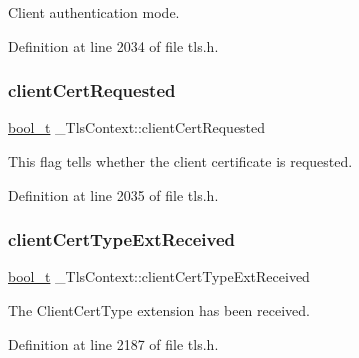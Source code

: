 Client authentication mode. 



Definition at line 2034 of file tls.\+h.

\mbox{\label{struct__TlsContext_a62a4d809ef9653728ad46a295a107bf6}} 
\subsubsection{\texorpdfstring{client\+Cert\+Requested}{clientCertRequested}}
{\footnotesize\ttfamily \hyperlink{compiler__port_8h_a812d16e5494522586b3784e55d479912}{bool\+\_\+t} \+\_\+\+Tls\+Context\+::client\+Cert\+Requested}



This flag tells whether the client certificate is requested. 



Definition at line 2035 of file tls.\+h.

\mbox{\label{struct__TlsContext_a8afe0bc107677db7d4314287841979e4}} 
\subsubsection{\texorpdfstring{client\+Cert\+Type\+Ext\+Received}{clientCertTypeExtReceived}}
{\footnotesize\ttfamily \hyperlink{compiler__port_8h_a812d16e5494522586b3784e55d479912}{bool\+\_\+t} \+\_\+\+Tls\+Context\+::client\+Cert\+Type\+Ext\+Received}



The Client\+Cert\+Type extension has been received. 



Definition at line 2187 of file tls.\+h.

\mbox{\label{struct__TlsContext_a2dca63a7256341ebc9583c8b94a17caf}} 
